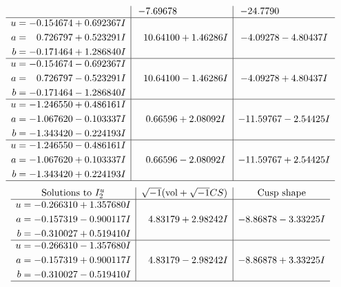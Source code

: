 \documentclass[1p]{elsarticle_modified}
\theoremstyle{definition}
\newcommand{\I}{\sqrt{-1}}
\begin{document}
$$\begin{array}{c|c|c}
 & -7.69678\phantom{ +0.000000I} & -24.7790\phantom{ +0.000000I} \\ \hline\begin{aligned}
u &= -0.154674 + 0.692367 I \\
a &= \phantom{-}0.726797 + 0.523291 I \\
b &= -0.171464 + 1.286840 I\end{aligned}
 & \phantom{-}10.64100 + 1.46286 I & -4.09278 - 4.80437 I \\ \hline\begin{aligned}
u &= -0.154674 - 0.692367 I \\
a &= \phantom{-}0.726797 - 0.523291 I \\
b &= -0.171464 - 1.286840 I\end{aligned}
 & \phantom{-}10.64100 - 1.46286 I & -4.09278 + 4.80437 I \\ \hline\begin{aligned}
u &= -1.246550 + 0.486161 I \\
a &= -1.067620 - 0.103337 I \\
b &= -1.343420 - 0.224193 I\end{aligned}
 & \phantom{-}0.66596 + 2.08092 I & -11.59767 - 2.54425 I \\ \hline\begin{aligned}
u &= -1.246550 - 0.486161 I \\
a &= -1.067620 + 0.103337 I \\
b &= -1.343420 + 0.224193 I\end{aligned}
 & \phantom{-}0.66596 - 2.08092 I & -11.59767 + 2.54425 I\\
 \hline 
 \end{array}$$\newpage$$\begin{array}{c|c|c}  
\text{Solutions to }I^u_{2}& \I (\text{vol} + \sqrt{-1}CS) & \text{Cusp shape}\\
 \hline 
\begin{aligned}
u &= -0.266310 + 1.357680 I \\
a &= -0.157319 - 0.900117 I \\
b &= -0.310027 + 0.519410 I\end{aligned}
 & \phantom{-}4.83179 + 2.98242 I & -8.86878 - 3.33225 I \\ \hline\begin{aligned}
u &= -0.266310 - 1.357680 I \\
a &= -0.157319 + 0.900117 I \\
b &= -0.310027 - 0.519410 I\end{aligned}
 & \phantom{-}4.83179 - 2.98242 I & -8.86878 + 3.33225 I\\
 \hline 
 \end{array}$$\newpage
\end{document}
